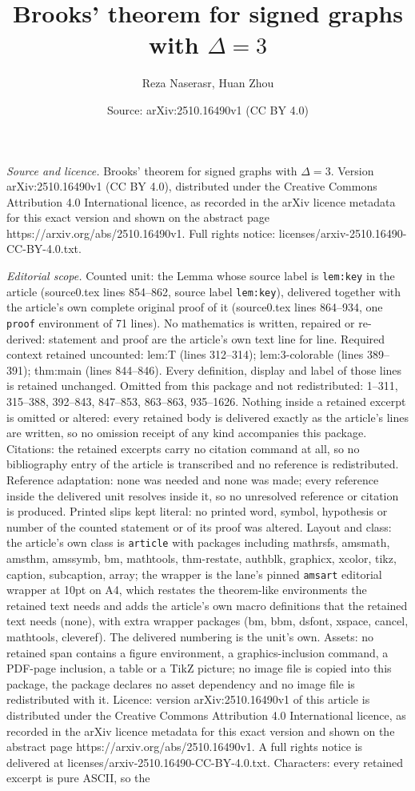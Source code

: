 \documentclass[10pt,a4paper]{amsart}
\title[Brooks' theorem for signed graphs with $\Delta=3$]{Brooks' theorem for signed graphs with $\Delta=3$}
\author{Reza Naserasr, Huan Zhou}
\date{Source: arXiv:2510.16490v1 (CC BY 4.0)}
\begin{document}
\maketitle

\noindent\emph{Source and licence.} Brooks' theorem for signed graphs with $\Delta=3$. Version arXiv:2510.16490v1 (CC BY 4.0), distributed under the Creative Commons Attribution 4.0 International licence, as recorded in the arXiv licence metadata for this exact version and shown on the abstract page https://arxiv.org/abs/2510.16490v1. Full rights notice: licenses/arxiv-2510.16490-CC-BY-4.0.txt.\par\smallskip

\noindent\textit{Editorial scope.} Counted unit: the Lemma whose source label is \texttt{lem:key} in the article (source0.tex lines 854--862, source label \texttt{lem:key}), delivered together with the article's own complete original proof of it (source0.tex lines 864--934, one \texttt{proof} environment of 71 lines). No mathematics is written, repaired or re-derived: statement and proof are the article's own text line for line. Required context retained uncounted: lem:T (lines 312--314); lem:3-colorable (lines 389--391); thm:main (lines 844--846). Every definition, display and label of those lines is retained unchanged. Omitted from this package and not redistributed: 1--311, 315--388, 392--843, 847--853, 863--863, 935--1626. Nothing inside a retained excerpt is omitted or altered: every retained body is delivered exactly as the article's lines are written, so no omission receipt of any kind accompanies this package. Citations: the retained excerpts carry no citation command at all, so no bibliography entry of the article is transcribed and no reference is redistributed. Reference adaptation: none was needed and none was made; every reference inside the delivered unit resolves inside it, so no unresolved reference or citation is produced. Printed slips kept literal: no printed word, symbol, hypothesis or number of the counted statement or of its proof was altered. Layout and class: the article's own class is \texttt{article} with packages including mathrsfs, amsmath, amsthm, amssymb, bm, mathtools, thm-restate, authblk, graphicx, xcolor, tikz, caption, subcaption, array; the wrapper is the lane's pinned \texttt{amsart} editorial wrapper at 10pt on A4, which restates the theorem-like environments the retained text needs and adds the article's own macro definitions that the retained text needs (none), with extra wrapper packages (bm, bbm, dsfont, xspace, cancel, mathtools, cleveref). The delivered numbering is the unit's own. Assets: no retained span contains a figure environment, a graphics-inclusion command, a PDF-page inclusion, a table or a TikZ picture; no image file is copied into this package, the package declares no asset dependency and no image file is redistributed with it. Licence: version arXiv:2510.16490v1 of this article is distributed under the Creative Commons Attribution 4.0 International licence, as recorded in the arXiv licence metadata for this exact version and shown on the abstract page https://arxiv.org/abs/2510.16490v1. A full rights notice is delivered at licenses/arxiv-2510.16490-CC-BY-4.0.txt. Characters: every retained excerpt is pure ASCII, so the 
\end{document}

